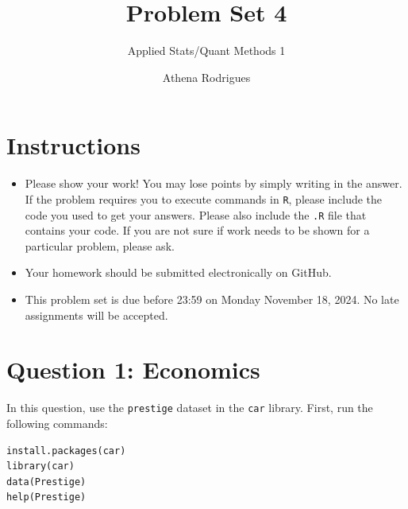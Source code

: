 \documentclass[12pt,letterpaper]{article}
\title{Problem Set 4}
\date{Athena Rodrigues}
\author{Applied Stats/Quant Methods 1}
\begin{document}
	\maketitle
	\section*{Instructions}
	\begin{itemize}
		\item Please show your work! You may lose points by simply writing in the answer. If the problem requires you to execute commands in \texttt{R}, please include the code you used to get your answers. Please also include the \texttt{.R} file that contains your code. If you are not sure if work needs to be shown for a particular problem, please ask.
		\item Your homework should be submitted electronically on GitHub.
		\item This problem set is due before 23:59 on Monday November 18, 2024. No late assignments will be accepted.
	\end{itemize}



	\vspace{.5cm}
\section*{Question 1: Economics}
\vspace{.25cm}
\noindent 	
In this question, use the \texttt{prestige} dataset in the \texttt{car} library. First, run the following commands:

\begin{verbatim}
install.packages(car)
library(car)
data(Prestige)
help(Prestige)
\end{verbatim} 
\end{document}
